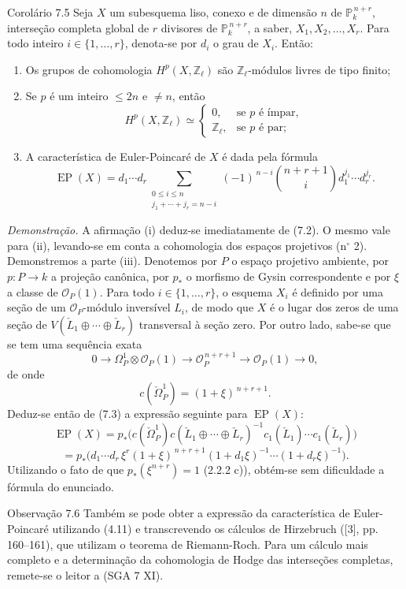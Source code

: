 \begin{statement}{Corolário 7.5}
Seja $X$ um subesquema liso, conexo e de dimensão $n$ de $\mathbb P_k^{\,n+r}$, interseção completa global de $r$ divisores de $\mathbb P_k^{\,n+r}$, a saber, $X_1,X_2,\ldots,X_r$. Para todo inteiro $i\in\{1,\ldots,r\}$, denota-se por $d_i$ o grau de $X_i$. Então:
\begin{enumerate}[label=(\roman*)]
\item Os grupos de cohomologia $H^p(X,\mathbb Z_\ell)$ são $\mathbb Z_\ell$-módulos livres de tipo finito;
\item Se $p$ é um inteiro $\le 2n$ e $\ne n$, então
\[
H^p(X,\mathbb Z_\ell)\simeq
\begin{cases}
0,&\text{se }p\text{ é ímpar},\\
\mathbb Z_\ell,&\text{se }p\text{ é par};
\end{cases}
\]
\item A característica de Euler-Poincaré de $X$ é dada pela fórmula
\[
\operatorname{EP}(X)
=d_1\cdots d_r
\sum_{\substack{0\le i\le n\\ j_1+\cdots+j_r=n-i}}
(-1)^{\,n-i}\binom{n+r+1}{i}
d_1^{j_1}\cdots d_r^{j_r}.
\]
\end{enumerate}
\end{statement}

\emph{Demonstração.} A afirmação (i) deduz-se imediatamente de (7.2). O mesmo vale para (ii), levando-se em conta a cohomologia dos espaços projetivos (n$^\circ$ 2). Demonstremos a parte (iii). Denotemos por $P$ o espaço projetivo ambiente, por $p:P\to k$ a projeção canônica, por $p_*$ o morfismo de Gysin correspondente e por $\xi$ a classe de $\mathcal O_P(1)$. Para todo $i\in\{1,\ldots,r\}$, o esquema $X_i$ é definido por uma seção de um $\mathcal O_P$-módulo inversível $L_i$, de modo que $X$ é o lugar dos zeros de uma seção de $V(\check L_1\oplus\cdots\oplus\check L_r)$ transversal à seção zero. Por outro lado, sabe-se que se tem uma sequência exata
\[
0\to\Omega_P^1\otimes\mathcal O_P(1)\to\mathcal O_P^{\,n+r+1}\to\mathcal O_P(1)\to0,
\]
de onde
\[
c(\check\Omega_P^1)=(1+\xi)^{\,n+r+1}.
\]
Deduz-se então de (7.3) a expressão seguinte para $\operatorname{EP}(X)$:
\[
\operatorname{EP}(X)
=p_*\bigl(c(\check\Omega_P^1)c(\check L_1\oplus\cdots\oplus\check L_r)^{-1}
c_1(\check L_1)\cdots c_1(\check L_r)\bigr)
\]
\[
=p_*\bigl(d_1\cdots d_r\,\xi^r(1+\xi)^{\,n+r+1}
(1+d_1\xi)^{-1}\cdots(1+d_r\xi)^{-1}\bigr).
\]
Utilizando o fato de que $p_*(\xi^{n+r})=1$ (2.2.2 c)), obtém-se sem dificuldade a fórmula do enunciado.

\begin{statement}{Observação 7.6}
Também se pode obter a expressão da característica de Euler-Poincaré utilizando (4.11) e transcrevendo os cálculos de Hirzebruch ([3], pp. 160--161), que utilizam o teorema de Riemann-Roch. Para um cálculo mais completo e a determinação da cohomologia de Hodge das interseções completas, remete-se o leitor a (SGA 7 XI).
\end{statement}

